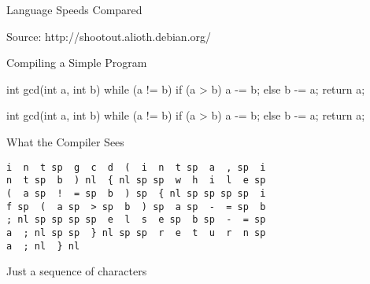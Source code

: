 \documentclass{plt}
\begin{document}
\begin{frame}[fragile]{Language Speeds Compared}

\tiny
Source: http://shootout.alioth.debian.org/
\end{frame}

\begin{frame}[fragile]{Compiling a Simple Program}

\begin{C}
int gcd(int a, int b)
{
  while (a != b) {
    if (a > b) a -= b;
    else b -= a;
  }
  return a;
}
\end{C}

\end{frame}
\newsavebox{\gcdbox}
\begin{lrbox}{\gcdbox}
\begin{minipage}{0.4\textwidth}
\begin{C}
int gcd(int a, int b)
{
  while (a != b) {
    if (a > b) a -= b;
    else b -= a;
  }
  return a;
}
\end{C}
\end{minipage}
\end{lrbox}


\begin{frame}[fragile]{What the Compiler Sees}

\usebox{\gcdbox}

\begin{verbatim}
i  n  t sp  g  c  d  (  i  n  t sp  a  , sp  i
n  t sp  b  ) nl  { nl sp sp  w  h  i  l  e sp
(  a sp  !  = sp  b  ) sp  { nl sp sp sp sp  i
f sp  (  a sp  > sp  b  ) sp  a sp  -  = sp  b
; nl sp sp sp sp  e  l  s  e sp  b sp  -  = sp
a  ; nl sp sp  } nl sp sp  r  e  t  u  r  n sp
a  ; nl  } nl
\end{verbatim}

Just a sequence of characters

\end{frame}
\end{document}
